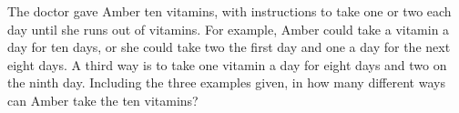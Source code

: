 The doctor gave Amber ten vitamins, with instructions to take one or two each day until she runs out of vitamins. For example, Amber could take a vitamin a day for ten days, or she could take two the first day and one a day for the next eight days. A third way is to take one vitamin a day for eight days and two on the ninth day. Including the three examples given, in how many different ways can Amber take the ten vitamins?
